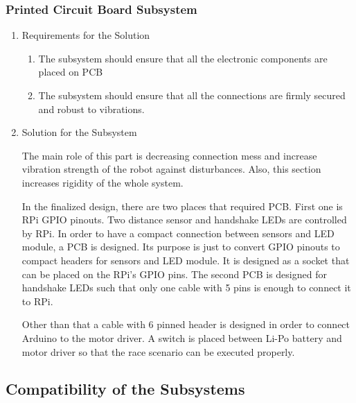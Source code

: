 \documentclass[a4paper,12pt]{article}
\begin{document}
\subsubsection{Printed Circuit Board Subsystem}
	\begin{enumerate}
		\item {Requirements for the Solution}
		
		\begin{enumerate}
			\item The subsystem should ensure that all the electronic components are placed on PCB
			\item The subsystem should ensure that all the connections are firmly secured and robust to vibrations.
		\end{enumerate} 

	\item {Solution for the Subsystem}

		The main role of this part is decreasing connection mess and increase vibration strength of the robot against disturbances. Also, this section increases rigidity of the whole system. 
		
		In the finalized design, there are two places that required PCB. First one is RPi GPIO pinouts. Two distance sensor and handshake LEDs are controlled by RPi. In order to have a compact connection between sensors and LED module, a PCB is designed. Its purpose is just to convert GPIO pinouts to compact headers for sensors and LED module. It is designed as a socket that can be placed on the RPi's GPIO pins. The second PCB is designed for handshake LEDs such that only one cable with 5 pins is enough to connect it to RPi.  
		
		Other than that a cable with 6 pinned header is designed in order to connect Arduino to the motor driver. A switch is placed between Li-Po battery and motor driver so that the race scenario can be executed properly.




	\end{enumerate}	




\subsection{Compatibility of the Subsystems}

\end{document}
